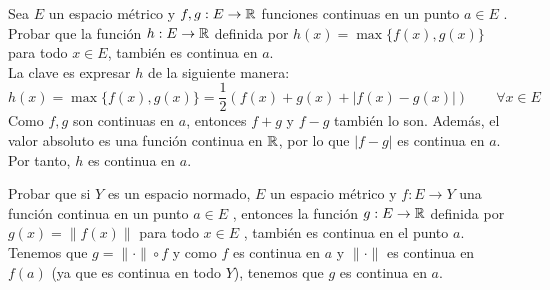 \begin{ejercicio}
    Sea $E$ un espacio métrico y $f,g : E \to \mathbb{R}$ funciones continuas en un punto $a\in E$ . Probar que la función $h : E \to \mathbb{R}$ definida por $h(x) = \max \{f(x), g(x)\}$ para todo $x\in E$, también es continua en $a$.\\

    \noindent
    La clave es expresar $h$ de la siguiente manera:
    $$h(x)=\max\{f(x),g(x)\}=\frac{1}{2}\left(f(x)+g(x)+|f(x)-g(x)|\right) \qquad \forall x\in E$$
    Como $f,g$ son continuas en $a$, entonces $f+g$ y $f-g$ también lo son. Además, el valor absoluto es una función continua en $\mathbb{R}$,
    por lo que $|f-g|$ es continua en $a$. Por tanto, $h$ es continua en $a$.
\end{ejercicio}


\begin{ejercicio}
    Probar que si $Y$ es un espacio normado, $E$ un espacio métrico y $f:E \to Y$ una función continua en un punto $a \in E$ , entonces la función $g: E \to \mathbb{R}$ definida por $g(x)=\|f(x)\|$ para todo $x\in E$ , también es continua en el punto $a$.\\

    \noindent
    Tenemos que $g = \|\cdot\| \circ f$ y como $f$ es continua en $a$ y $\|\cdot\|$ es continua en $f(a)$ (ya que es continua en todo $Y$), tenemos que $g$ es continua en $a$.
\end{ejercicio}

